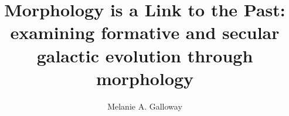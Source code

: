 \phd %

\title{\bf Morphology is a Link to the Past: examining formative and secular galactic evolution through morphology}
\author{Melanie A. Galloway}


\abstract{}
\copyrightpage %
\acknowledgements{}
\dedication{}


\beforepreface 

\figurespage
\tablespage

\afterpreface            
